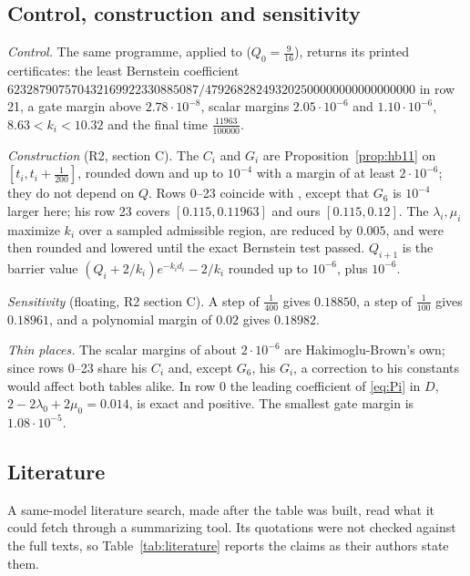 \documentclass[11pt]{article}
\theoremstyle{definition}
\theoremstyle{remark}
\numberwithin{equation}{section}
\begin{document}
\subsection{Control, construction and sensitivity}

\emph{Control.} The same programme, applied to \cite[Table~3]{hb}
($Q_0=\frac9{16}$), returns its printed certificates: the least Bernstein
coefficient
$623287907570432169922330885087/479268282493202500000000000000000$ in row
21, a gate margin above $2.78\cdot10^{-8}$, scalar margins
$2.05\cdot10^{-6}$ and $1.10\cdot10^{-6}$, $8.63<k_i<10.32$ and the final
time $\frac{11963}{100000}$.

\emph{Construction} (R2, section C). The $C_i$ and $G_i$ are
Proposition~\ref{prop:hb11} on $[t_i,t_i+\frac1{200}]$, rounded down and up
to $10^{-4}$ with a margin of at least $2\cdot10^{-6}$; they do not depend
on $Q$. Rows 0--23 coincide with
\cite[Table~3]{hb}, except that $G_6$ is $10^{-4}$ larger here; his row 23
covers $[0.115,0.11963]$ and ours $[0.115,0.12]$. The $\lambda_i,\mu_i$
maximize $k_i$ over a sampled admissible region, are reduced by $0.005$,
and were then rounded and lowered until the exact Bernstein test passed.
$Q_{i+1}$ is the barrier value $(Q_i+2/k_i)e^{-k_id_i}-2/k_i$ rounded up
to $10^{-6}$, plus $10^{-6}$.

\emph{Sensitivity} (floating, R2 section C). A step of $\frac1{400}$ gives
$0.18850$, a step of $\frac1{100}$ gives $0.18961$, and a polynomial margin
of $0.02$ gives $0.18982$.

\emph{Thin places.} The scalar margins of about $2\cdot10^{-6}$ are
Hakimoglu-Brown's own; since rows 0--23 share his $C_i$ and, except
$G_6$, his $G_i$, a correction to his constants would affect both tables
alike. In row 0 the leading coefficient of \eqref{eq:Pi} in $D$,
$2-2\lambda_0+2\mu_0=0.014$, is exact and positive. The smallest gate
margin is $1.08\cdot10^{-5}$.

\subsection{Literature}\label{sec:literature}

A same-model literature search, made after the table was built, read what
it could fetch through a summarizing tool. Its quotations were not checked
against the full texts, so Table~\ref{tab:literature} reports the claims as
their authors state them.
\end{document}
